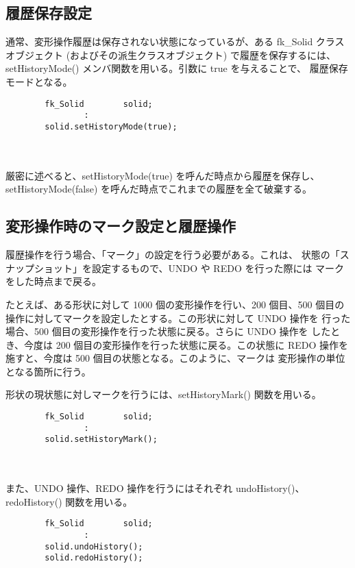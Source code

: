 \subsection{履歴保存設定} \label{sec:shapehistory}
通常、変形操作履歴は保存されない状態になっているが、ある fk\_Solid クラス	オブジェクト (およびその派生クラスオブジェクト) で履歴を保存するには、
setHistoryMode() メンバ関数を用いる。引数に true を与えることで、
履歴保存モードとなる。\\
\begin{screen}
\begin{verbatim}
        fk_Solid        solid;
                :
        solid.setHistoryMode(true);
\end{verbatim}
\end{screen} \\ ~ \\
厳密に述べると、setHistoryMode(true) を呼んだ時点から履歴を保存し、
setHistoryMode(false) を呼んだ時点でこれまでの履歴を全て破棄する。

\subsection{変形操作時のマーク設定と履歴操作}
履歴操作を行う場合、「マーク」の設定を行う必要がある。これは、
状態の「スナップショット」を設定するもので、UNDO や REDO を行った際には
マークをした時点まで戻る。

たとえば、ある形状に対して 1000 個の変形操作を行い、200 個目、500 個目の
操作に対してマークを設定したとする。この形状に対して UNDO 操作を
行った場合、500 個目の変形操作を行った状態に戻る。さらに UNDO 操作を
したとき、今度は 200 個目の変形操作を行った状態に戻る。この状態に
REDO 操作を施すと、今度は 500 個目の状態となる。このように、マークは
変形操作の単位となる箇所に行う。

形状の現状態に対しマークを行うには、setHistoryMark() 関数を用いる。\\
\begin{screen}
\begin{verbatim}
        fk_Solid        solid;
                :
        solid.setHistoryMark();
\end{verbatim}
\end{screen} \\ ~ \\
また、UNDO 操作、REDO 操作を行うにはそれぞれ undoHistory()、
redoHistory() 関数を用いる。\\
\begin{screen}
\begin{verbatim}
        fk_Solid        solid;
                :
        solid.undoHistory();
        solid.redoHistory();
\end{verbatim}
\end{screen}
